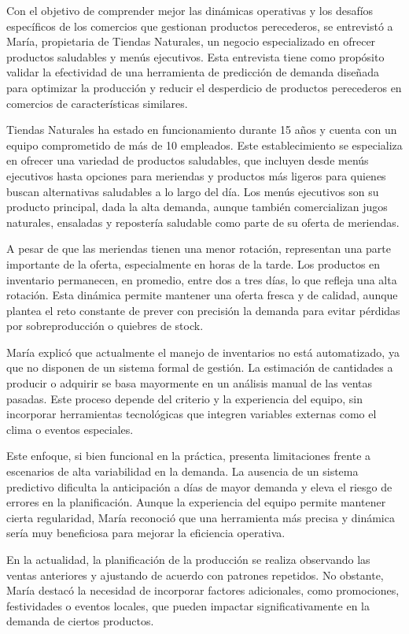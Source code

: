 Con el objetivo de comprender mejor las dinámicas operativas y los desafíos específicos de los comercios que gestionan productos perecederos, se entrevistó a María, propietaria de Tiendas Naturales, un negocio especializado en ofrecer productos saludables y menús ejecutivos. Esta entrevista tiene como propósito validar la efectividad de una herramienta de predicción de demanda diseñada para optimizar la producción y reducir el desperdicio de productos perecederos en comercios de características similares.

Tiendas Naturales ha estado en funcionamiento durante 15 años y cuenta con un equipo comprometido de más de 10 empleados. Este establecimiento se especializa en ofrecer una variedad de productos saludables, que incluyen desde menús ejecutivos hasta opciones para meriendas y productos más ligeros para quienes buscan alternativas saludables a lo largo del día. Los menús ejecutivos son su producto principal, dada la alta demanda, aunque también comercializan jugos naturales, ensaladas y repostería saludable como parte de su oferta de meriendas.

\indent A pesar de que las meriendas tienen una menor rotación, representan una parte importante de la oferta, especialmente en horas de la tarde. Los productos en inventario permanecen, en promedio, entre dos a tres días, lo que refleja una alta rotación. Esta dinámica permite mantener una oferta fresca y de calidad, aunque plantea el reto constante de prever con precisión la demanda para evitar pérdidas por sobreproducción o quiebres de stock.

\indent María explicó que actualmente el manejo de inventarios no está automatizado, ya que no disponen de un sistema formal de gestión. La estimación de cantidades a producir o adquirir se basa mayormente en un análisis manual de las ventas pasadas. Este proceso depende del criterio y la experiencia del equipo, sin incorporar herramientas tecnológicas que integren variables externas como el clima o eventos especiales.

\indent Este enfoque, si bien funcional en la práctica, presenta limitaciones frente a escenarios de alta variabilidad en la demanda. La ausencia de un sistema predictivo dificulta la anticipación a días de mayor demanda y eleva el riesgo de errores en la planificación. Aunque la experiencia del equipo permite mantener cierta regularidad, María reconoció que una herramienta más precisa y dinámica sería muy beneficiosa para mejorar la eficiencia operativa.

\indent En la actualidad, la planificación de la producción se realiza observando las ventas anteriores y ajustando de acuerdo con patrones repetidos. No obstante, María destacó la necesidad de incorporar factores adicionales, como promociones, festividades o eventos locales, que pueden impactar significativamente en la demanda de ciertos productos.

